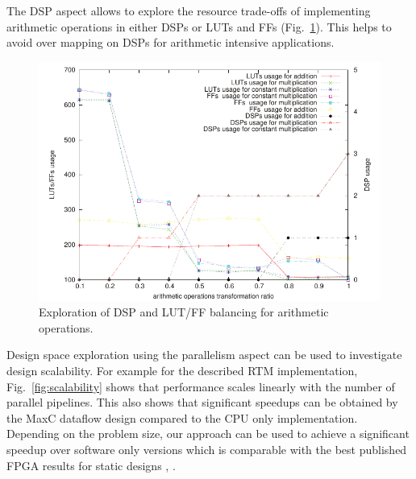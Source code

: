 The DSP aspect allows to explore the resource trade-offs of
implementing arithmetic operations in either DSPs or LUTs and FFs
(Fig.~\ref{fig:arith}). This helps to avoid over mapping on DSPs for
arithmetic intensive applications.

\begin{figure}[!h]
\includegraphics[scale=0.7]{figs/arith}
\caption{Exploration of DSP and LUT/FF balancing for arithmetic
  operations.}
\label{fig:arith}
\end{figure}

Design space exploration using the parallelism aspect can be used to
investigate design scalability. For example for the described RTM
implementation, Fig.~\ref{fig:scalability} shows that performance
scales linearly with the number of parallel pipelines. This also shows
that significant speedups can be obtained by the MaxC dataflow design
compared to the CPU only implementation. Depending on the problem
size, our approach can be used to achieve a significant speedup over
software only versions which is comparable with the best published
FPGA results for static designs
\cite{Xinyu:Qiwei:Luk:Qiang:Pell:2012}, \cite{araya2011assessing}.






